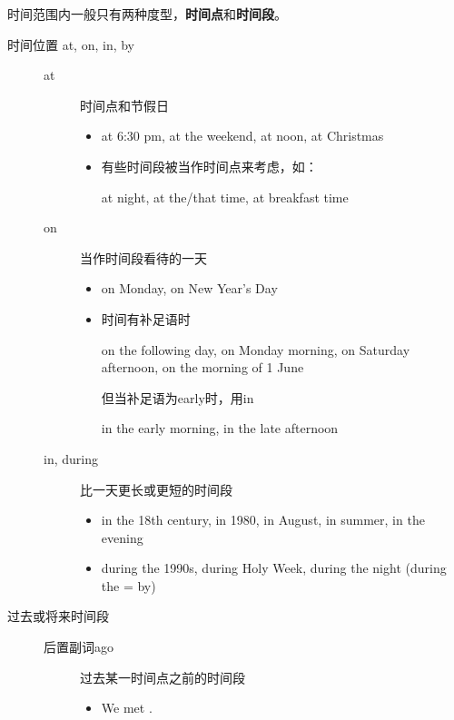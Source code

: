 时间范围内一般只有两种度型，\textbf{时间点}和\textbf{时间段}。

\begin{description}
\item[时间位置 at, on, in, by]
  \begin{description}

  \item[at] 时间点和节假日
    \begin{itemize}
    \item at 6:30 pm, at the weekend, at noon, at Christmas

    \item 有些时间段被当作时间点来考虑，如：

      at night, at the/that time, at breakfast time
    \end{itemize}

  \item[on] 当作时间段看待的一天
    \begin{itemize}
    \item on Monday, on New Year's Day


    \item 时间有补足语时

      on the following day, on Monday morning, on Saturday afternoon, on the
      morning of 1 June

      但当补足语为early时，用in

      in the early morning, in the late afternoon
    \end{itemize}

  \item[in, during] 比一天更长或更短的时间段
    \begin{itemize}
    \item in the 18th century, in 1980, in August, in summer, in the evening

    \item during the 1990s, during Holy Week, during the night (during the = by)
    \end{itemize}
  \end{description}

\item[过去或将来时间段]
  \begin{description}
  \item[后置副词ago] 过去某一时间点之前的时间段

    \begin{itemize}
    \item We met .
    \end{itemize}


\end{description}
\end{description}
